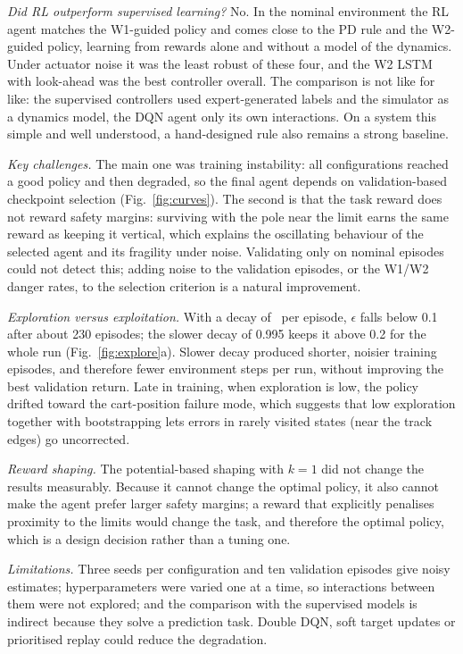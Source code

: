 \documentclass[conference]{IEEEtran}
\begin{document}
\emph{Did RL outperform supervised learning?} No. In the nominal environment the RL agent
matches the W1-guided policy and comes close to the PD rule and the W2-guided policy,
learning from rewards alone and without a model of the dynamics. Under actuator noise it
was the least robust of these four, and the W2 LSTM with look-ahead was the best
controller overall. The comparison is not like for like: the supervised controllers used
expert-generated labels and the simulator as a dynamics model, the DQN agent only its own
interactions. On a system this simple and well understood, a hand-designed rule also
remains a strong baseline.

\emph{Key challenges.} The main one was training instability: all configurations reached
a good policy and then degraded, so the final agent depends on validation-based
checkpoint selection (Fig.~\ref{fig:curves}). The second is that the task reward does
not reward safety margins: surviving with the pole near the limit earns the same
reward as keeping it vertical, which explains the oscillating behaviour of the selected
agent and its fragility under noise. Validating only on nominal episodes could not detect
this; adding noise to the validation episodes, or the W1/W2 danger rates, to the
selection criterion is a natural improvement.

\emph{Exploration versus exploitation.} With a decay of \EpsDecay\ per episode,
$\epsilon$ falls below 0.1 after about 230 episodes; the slower decay of 0.995 keeps it
above 0.2 for the whole run (Fig.~\ref{fig:explore}a). Slower decay produced shorter,
noisier training episodes, and therefore fewer environment steps per run, without
improving the best validation return. Late in training, when exploration is low, the policy drifted
toward the cart-position failure mode, which suggests that low exploration together with
bootstrapping lets errors in rarely visited states (near the track edges) go uncorrected.

\emph{Reward shaping.} The potential-based shaping with $k = 1$ did not change the
results measurably. Because it cannot change the optimal policy, it also cannot make the
agent prefer larger safety margins; a reward that explicitly penalises proximity to the
limits would change the task, and therefore the optimal policy, which is a design
decision rather than a tuning one.

\emph{Limitations.} Three seeds per configuration and ten validation episodes give noisy
estimates; hyperparameters were varied one at a time, so interactions between them
were not explored; and the comparison with the supervised models is indirect because
they solve a prediction task. Double DQN, soft target updates or prioritised replay
could reduce the degradation.
\end{document}
